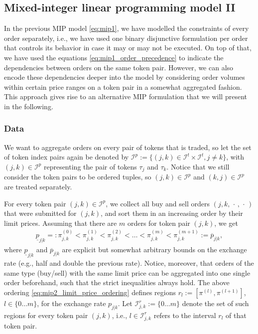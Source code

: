 \documentclass[11pt,parskip=full]{scrartcl}%
\newcommand*{\ie}{i.e., }
\newcommand*{\eg}{e.g., }
\newcommand*{\itokens}{\mathcal{I}^t}       %
\newcommand*{\itokenpairs}{\mathcal{I}^p}   %
\begin{document}
\subsection{Mixed-integer linear programming model II}
\label{subsec:MIPmodel_2}

In the previous MIP model \eqref{eq:mip1}, we have modelled the constraints of every order
separately, \ie we have used one binary disjunctive formulation per order that controls its
behavior in case it may or may not be executed.
On top of that, we have used the equations \eqref{eq:mip1_order_precedence} to indicate the
dependencies between orders on the same token pair.
However, we can also encode these dependencies deeper into the model by considering order volumes
within certain price ranges on a token pair in a somewhat aggregated fashion.
This approach gives rise to an alternative MIP formulation that we will present in the following.


\subsubsection*{Data}

We want to aggregate orders on every pair of tokens that is traded, so let the set of token index
pairs again be denoted by $ \itokenpairs := \{(j,k) \in \itokens \times \itokens, j \neq k\} $,
with $ (j,k) \in \itokenpairs $ representing the pair of tokens $ \tau_j $ and $ \tau_k $.
Notice that we still consider the token pairs to be ordered tuples, so $ (j,k) \in \itokenpairs $
and $ (k,j) \in \itokenpairs $ are treated separately.

For every token pair $ (j,k) \in \itokenpairs $, we collect all buy and sell orders
$ (j, k,\, \cdot \,,\, \cdot \,) $ that were submitted for $ (j,k) $, and sort them in an
increasing order by their limit prices.
Assuming that there are $ m $ orders for token pair $ (j,k) $, we get
\begin{align}
  \underline{p}_{j|k} =:
    \pi^{(0)}_{j,k} < \pi^{(1)}_{j,k} < \pi^{(2)}_{j,k} <
    \ldots < \pi^{(m)}_{j,k} < \pi^{(m+1)}_{j,k}
  := \overline{p}_{j|k},
  \label{eq:mip2_limit_price_ordering}
\end{align}
where $ \underline{p}_{j|k} $ and $ \overline{p}_{j|k} $ are explicit but somewhat arbitrary bounds
on the exchange rate (\eg half and double the previous rate).
Notice, moreover, that orders of the same type (buy/sell) with the same limit price can be
aggregated into one single order beforehand, such that the strict inequalities always hold.
The above ordering \eqref{eq:mip2_limit_price_ordering} defines regions
$ r_l := [\pi^{(l)},\pi^{(l+1)}] $, $ l \in \{0 \ldots m\} $, for the exchange rate $ p_{j|k} $.
Let $ \mathcal{I}_{j,k}^r := \{0 \ldots m\} $ denote the set of such regions for every token pair
$ (j,k) $, \ie $ l \in \mathcal{I}_{j,k}^r $ refers to the interval $ r_l $ of that token pair.
\end{document}
